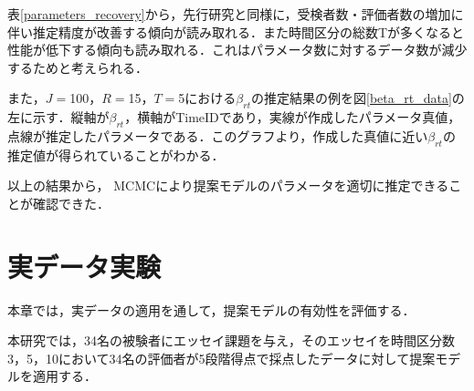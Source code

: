 \documentclass[dvipdfmx, twocolumn, a4paper]{hcresume}
\begin{document}
表\ref{parameters_recovery}から，先行研究と同様に，受検者数・評価者数の増加に伴い推定精度が改善する傾向が読み取れる．また時間区分の総数Tが多くなると性能が低下する傾向も読み取れる．これはパラメータ数に対するデータ数が減少するためと考えられる．

また，$J=$100，$R=$15，$T=$5における$\beta_{rt}$の推定結果の例を図\ref{beta_rt_data}の左に示す．縦軸が$\beta_{rt}$，横軸がTimeIDであり，実線が作成したパラメータ真値，点線が推定したパラメータである．このグラフより，作成した真値に近い$\beta_{rt}$の推定値が得られていることがわかる．

以上の結果から， MCMCにより提案モデルのパラメータを適切に推定できることが確認できた．

\section{実データ実験}
本章では，実データの適用を通して，提案モデルの有効性を評価する．

本研究では，34名の被験者にエッセイ課題を与え，そのエッセイを時間区分数3，5，10において34名の評価者が5段階得点で採点したデータに対して提案モデルを適用する．
\end{document}
